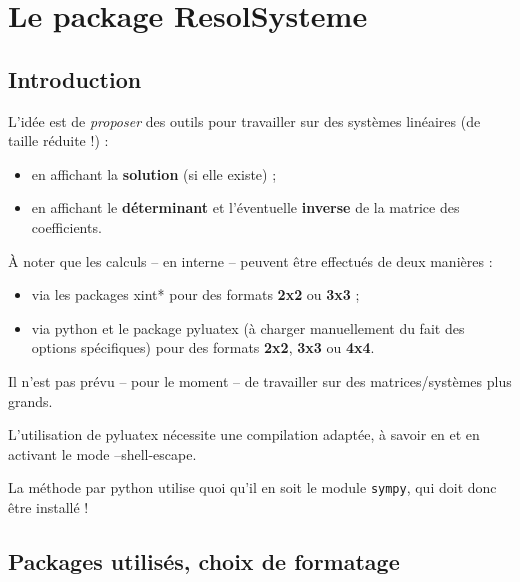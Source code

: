\documentclass[a4paper,11pt]{article}
\begin{document}
\section{Le package ResolSysteme}

\subsection{Introduction}

\begin{noteblock}
L'idée est de \textit{proposer} des outils pour travailler sur des systèmes linéaires (de taille réduite !) :

\begin{itemize}
	\item en affichant la \textbf{solution} (si elle existe) ;
	\item en affichant le \textbf{déterminant} et l'éventuelle \textbf{inverse} de la matrice des coefficients.
\end{itemize}
\vspace*{-\baselineskip}\leavevmode
\end{noteblock}

\begin{importantblock}
À noter que les calculs -- en interne -- peuvent être effectués de deux manières :

\begin{itemize}
	\item via les packages \textsf{xint*} pour des formats \textbf{2x2} ou \textbf{3x3} ;
	\item via \textsf{python} et le package \textsf{pyluatex} (à charger manuellement du fait des options spécifiques) pour des formats \textbf{2x2}, \textbf{3x3} ou \textbf{4x4}.
\end{itemize}

Il n'est pas prévu -- pour le moment -- de travailler sur des matrices/systèmes plus grands.
\end{importantblock}

\begin{warningblock}
L'utilisation de \textsf{pyluatex} nécessite une compilation adaptée, à savoir en  et en activant le mode \textsf{--shell-escape}. 

\smallskip

La méthode par \textsf{python} utilise quoi qu'il en soit le module \texttt{sympy}, qui doit donc être installé !
\end{warningblock}

\subsection{Packages utilisés, choix de formatage}
\end{document}
